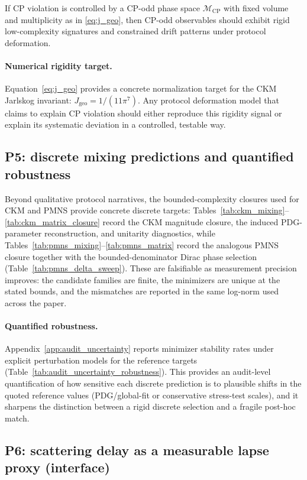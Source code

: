 If CP violation is controlled by a CP-odd phase space $\mathcal{M}_{\mathrm{CP}}$ with fixed volume and multiplicity as in \eqref{eq:j_geo}, then CP-odd observables should exhibit rigid low-complexity signatures and constrained drift patterns under protocol deformation.
\paragraph{Numerical rigidity target.}
Equation~\eqref{eq:j_geo} provides a concrete normalization target for the CKM Jarlskog invariant: $J_{\mathrm{geo}}=1/(11\pi^7)$.
Any protocol deformation model that claims to explain CP violation should either reproduce this rigidity signal or explain its systematic deviation in a controlled, testable way.

\subsection{P5: discrete mixing predictions and quantified robustness}
\label{subsec:p5_quantified_predictions}

Beyond qualitative protocol narratives, the bounded-complexity closures used for CKM and PMNS provide concrete discrete targets:
Tables~\ref{tab:ckm_mixing}--\ref{tab:ckm_matrix_closure} record the CKM magnitude closure, the induced PDG-parameter reconstruction, and unitarity diagnostics, while Tables~\ref{tab:pmns_mixing}--\ref{tab:pmns_matrix} record the analogous PMNS closure together with the bounded-denominator Dirac phase selection (Table~\ref{tab:pmns_delta_sweep}).
These are falsifiable as measurement precision improves: the candidate families are finite, the minimizers are unique at the stated bounds, and the mismatches are reported in the same log-norm used across the paper.

\paragraph{Quantified robustness.}
Appendix~\ref{app:audit_uncertainty} reports minimizer stability rates under explicit perturbation models for the reference targets (Table~\ref{tab:audit_uncertainty_robustness}).
This provides an audit-level quantification of how sensitive each discrete prediction is to plausible shifts in the quoted reference values (PDG/global-fit or conservative stress-test scales), and it sharpens the distinction between a rigid discrete selection and a fragile post-hoc match.

\subsection{P6: scattering delay as a measurable lapse proxy (interface)}
\label{subsec:p6_wigner_smith_delay}

